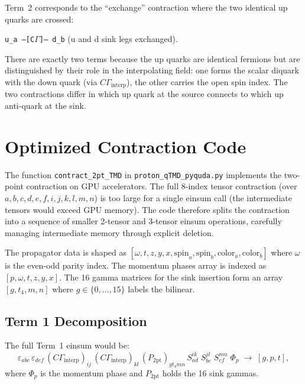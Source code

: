 \documentclass[11pt,a4paper]{article}
\newcommand{\eps}{\varepsilon}
\newcommand{\Gammaint}{\Gamma_{\text{interp}}}
\newcommand{\Cmat}{C}
\begin{document}
Term~2 corresponds to the ``exchange'' contraction where the two identical up quarks
are crossed:
\begin{center}
  \texttt{u\_a --[C$\Gamma$]-- d\_b} \quad (u and d sink legs exchanged).
\end{center}

There are exactly two terms because the up quarks are identical fermions but are
distinguished by their role in the interpolating field: one forms the scalar diquark
with the down quark (via $\Cmat\Gammaint$), the other carries the open spin index.
The two contractions differ in which up quark at the source connects to which up
anti-quark at the sink.

\section{Optimized Contraction Code}
\label{sec:contraction_code}

The function \texttt{contract\_2pt\_TMD} in \texttt{proton\_qTMD\_pyquda.py}
implements the two-point contraction on GPU accelerators. The full 8-index
tensor contraction (over $a,b,c,d,e,f,i,j,k,l,m,n$) is too large for a single
einsum call (the intermediate tensors would exceed GPU memory). The code therefore
splits the contraction into a sequence of smaller 2-tensor and 3-tensor einsum
operations, carefully managing intermediate memory through explicit deletion.

The propagator data is shaped as $[\omega, t, z, y, x, \mathrm{spin}_a,
\mathrm{spin}_b, \mathrm{color}_a, \mathrm{color}_b]$ where $\omega$ is the even-odd
parity index. The momentum phases array is indexed as $[p, \omega, t, z, y, x]$.
The 16 gamma matrices for the sink insertion form an array $[g, t_4, m, n]$ where
$g \in \{0,\dots,15\}$ labels the bilinear.

\subsection{Term 1 Decomposition}

The full Term~1 einsum would be:
\begin{equation}
  \eps_{abc}\,\eps_{def}\,
  (\Cmat\Gammaint)_{ij}\,(\Cmat\Gammaint)_{kl}\,
  (P_{2\mathrm{pt}})_{g t_4 mn}\,
  S^{ik}_{ad}\; S^{jl}_{be}\; S^{mn}_{cf}\;
  \Phi_p
  \;\to\; [g, p, t],
\end{equation}
where $\Phi_p$ is the momentum phase and $P_{2\mathrm{pt}}$ holds the 16 sink gammas.
\end{document}
